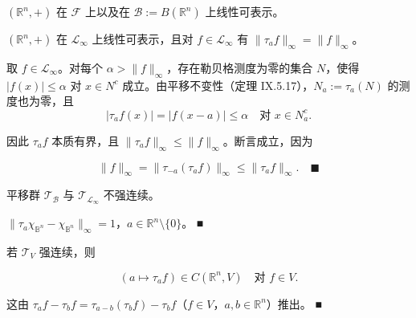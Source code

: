 \begin{remark}

\begin{items}
\item

$ (\mathbb{R}^{n},+) $ 在 $ \mathcal{F} $ 上以及在 $ \mathcal{B} := B(\mathbb{R}^{n}) $ 上线性可表示。

\item

$ (\mathbb{R}^{n},+) $ 在 $ \mathcal{L}_{\infty} $ 上线性可表示，且对 $ f \in \mathcal{L}_{\infty} $ 有 $ \|\tau_{a}f\|_{\infty} = \|f\|_{\infty} $。

\proofhead
取 $ f \in \mathcal{L}_{\infty} $。对每个 $ \alpha > \|f\|_{\infty} $，存在勒贝格测度为零的集合 $ N $，使得 $ |f(x)| \le \alpha $ 对 $ x \in N^{c} $ 成立。由平移不变性（定理 IX.5.17），$ N_{a} := \tau_{a}(N) $ 的测度也为零，且
\[
|\tau_{a}f(x)| = |f(x-a)| \le \alpha \quad \text{对 } x \in N_{a}^{c} .
\]

因此 $ \tau_{a}f $ 本质有界，且 $ \|\tau_{a}f\|_{\infty} \le \|f\|_{\infty} $。断言成立，因为

\[
\|f\|_{\infty} = \|\tau_{-a}(\tau_{a}f)\|_{\infty} \le \|\tau_{a}f\|_{\infty} .\quad\blacksquare
\]
\item

平移群 $ \mathcal{T}_{\mathcal{B}} $ 与 $ \mathcal{T}_{\mathcal{L}_{\infty}} $ 不强连续。

\proofhead
$ \|\tau_{a}\chi_{\mathbb{B}^{n}} - \chi_{\mathbb{B}^{n}}\|_{\infty} = 1 $，$ a \in \mathbb{R}^{n} \setminus \{0\} $。 \nobreak\hspace{0.35em}■
\item

若 $ \mathcal{T}_{V} $ 强连续，则

\[
(a \mapsto \tau_{a}f) \in C(\mathbb{R}^{n},V) \quad \text{对 } f \in V .
\]

\proofhead
这由 $ \tau_{a}f - \tau_{b}f = \tau_{a-b}(\tau_{b}f) - \tau_{b}f $（$ f \in V $，$ a, b \in \mathbb{R}^{n} $）推出。 \nobreak\hspace{0.35em}■
\end{items}

\end{remark}

